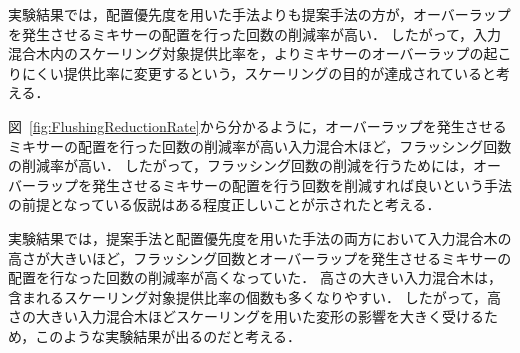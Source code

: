 実験結果では，配置優先度を用いた手法よりも提案手法の方が，オーバーラップを発生させるミキサーの配置を行った回数の削減率が高い．
したがって，入力混合木内のスケーリング対象提供比率を，よりミキサーのオーバーラップの起こりにくい提供比率に変更するという，スケーリングの目的が達成されていると考える．

図~\ref{fig:FlushingReductionRate}から分かるように，オーバーラップを発生させるミキサーの配置を行った回数の削減率が高い入力混合木ほど，フラッシング回数の削減率が高い．
したがって，フラッシング回数の削減を行うためには，オーバーラップを発生させるミキサーの配置を行う回数を削減すれば良いという手法の前提となっている仮説はある程度正しいことが示されたと考える．

実験結果では，提案手法と配置優先度を用いた手法の両方において入力混合木の高さが大きいほど，フラッシング回数とオーバーラップを発生させるミキサーの配置を行なった回数の削減率が高くなっていた．
高さの大きい入力混合木は，含まれるスケーリング対象提供比率の個数も多くなりやすい．
したがって，高さの大きい入力混合木ほどスケーリングを用いた変形の影響を大きく受けるため，このような実験結果が出るのだと考える．

